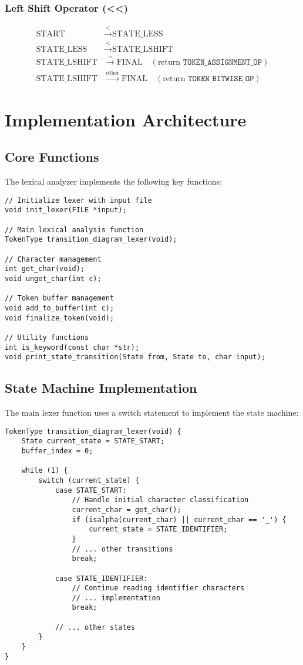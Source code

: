 \documentclass[12pt,a4paper]{article}
\begin{document}
\subsubsection{Left Shift Operator (<<)}
\begin{align}
\text{START} &\xrightarrow{<} \text{STATE\_LESS} \\
\text{STATE\_LESS} &\xrightarrow{<} \text{STATE\_LSHIFT} \\
\text{STATE\_LSHIFT} &\xrightarrow{=} \text{FINAL} \quad (\text{return } \texttt{TOKEN\_ASSIGNMENT\_OP}) \\
\text{STATE\_LSHIFT} &\xrightarrow{\text{other}} \text{FINAL} \quad (\text{return } \texttt{TOKEN\_BITWISE\_OP})
\end{align}

\section{Implementation Architecture}

\subsection{Core Functions}
The lexical analyzer implements the following key functions:

\begin{lstlisting}
// Initialize lexer with input file
void init_lexer(FILE *input);

// Main lexical analysis function
TokenType transition_diagram_lexer(void);

// Character management
int get_char(void);
void unget_char(int c);

// Token buffer management
void add_to_buffer(int c);
void finalize_token(void);

// Utility functions
int is_keyword(const char *str);
void print_state_transition(State from, State to, char input);
\end{lstlisting}

\subsection{State Machine Implementation}
The main lexer function uses a switch statement to implement the state machine:

\begin{lstlisting}
TokenType transition_diagram_lexer(void) {
    State current_state = STATE_START;
    buffer_index = 0;
    
    while (1) {
        switch (current_state) {
            case STATE_START:
                // Handle initial character classification
                current_char = get_char();
                if (isalpha(current_char) || current_char == '_') {
                    current_state = STATE_IDENTIFIER;
                }
                // ... other transitions
                break;
                
            case STATE_IDENTIFIER:
                // Continue reading identifier characters
                // ... implementation
                break;
                
            // ... other states
        }
    }
}
\end{lstlisting}
\end{document}
